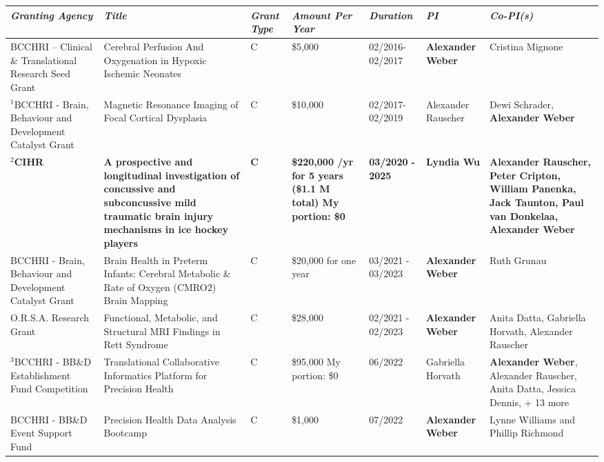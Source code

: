 \documentclass[11pt,notitlepage,english]{report}
\begin{document}
\setlength\LTleft{-1cm}
\setlength\LTright{-1cm}
\begin{longtable}{|L{2.7cm}|L{4cm}|L{1cm}|L{2cm}|L{1.7cm}|L{2cm}|L{3cm}|}
  \hline
  \textit{\textbf{Granting Agency}} & \textit{\textbf{Title}} & \textit{\textbf{Grant Type}} & \textit{\textbf{Amount Per Year}} & \textit{\textbf{Duration}} & \textit{\textbf{PI}} & \textit{\textbf{Co-PI(s)}} \\
  \hline
  BCCHRI – Clinical \& Translational Research Seed Grant & Cerebral Perfusion And Oxygenation in Hypoxic Ischemic Neonates & C & \$5,000 & 02/2016-02/2017 & \textbf{Alexander Weber} & Cristina Mignone \\
  \hline
  $^{1}$BCCHRI - Brain, Behaviour and Development Catalyst Grant & Magnetic Resonance Imaging of Focal Cortical Dysplasia & C & \$10,000 & 02/2017-02/2019 & Alexander Rauscher & Dewi Schrader, \textbf{Alexander Weber } \\
  \hline
  \textbf{$^{2}$CIHR} & \textbf{A prospective and longitudinal investigation of concussive and subconcussive mild traumatic brain injury mechanisms in ice hockey players} & \textbf{C} & \textbf{\$220,000 /yr for 5 years (\$1.1 M total) \newline \newline My portion: \$0} & \textbf{03/2020 - 2025} & \textbf{Lyndia Wu} & \textbf{Alexander Rauscher, Peter Cripton, William Panenka, Jack Taunton, Paul van Donkelaa, Alexander Weber} \\
  \hline
  BCCHRI - Brain, Behaviour and Development Catalyst Grant & Brain Health in Preterm Infants: Cerebral Metabolic \& Rate of Oxygen (CMRO2) Brain Mapping & C & \$20,000 for one year & 03/2021 - 03/2023 & \textbf{Alexander Weber} & Ruth Grunau \\
  \hline
  O.R.S.A. Research Grant & Functional, Metabolic, and Structural MRI Findings in Rett Syndrome & C & \$28,000 & 02/2021 - 02/2023 & \textbf{Alexander Weber} & Anita Datta, Gabriella Horvath, Alexander Rauscher \\
  \hline
  $^{3}$BCCHRI - BB\&D Establishment Fund Competition & Translational Collaborative Informatics Platform for Precision Health & C & \$95,000 \newline My portion: \$0 & 06/2022 & Gabriella Horvath & \textbf{Alexander Weber}, Alexander Rauscher, Anita Datta, Jessica Dennis, + 13 more \\
  \hline
  BCCHRI - BB\&D Event Support Fund & Precision Health Data Analysis Bootcamp & C & \$1,000 & 07/2022 & \textbf{Alexander Weber} & Lynne Williams and Phillip Richmond \\

\end{longtable}
\end{document}
